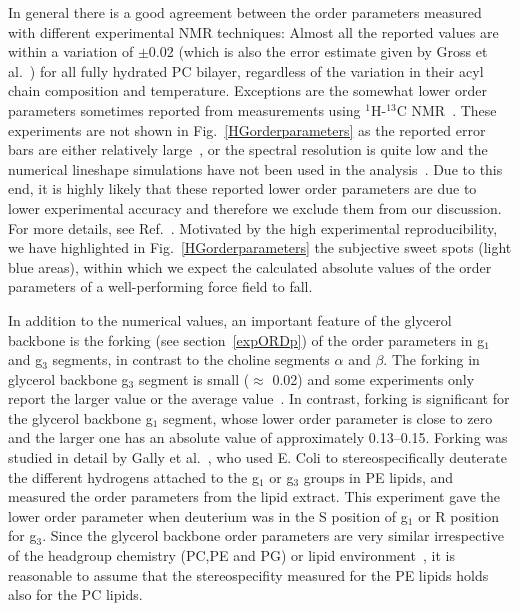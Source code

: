 \documentclass[journal=jacsat,manuscript=article]{achemso}
\begin{document}
In general there is a good agreement between the order parameters measured with different experimental NMR techniques: Almost all the 
reported values are within a variation of $\pm$0.02 (which is also the error estimate given by Gross et al.~\cite{gross97}) 
for all fully hydrated PC bilayer, regardless of the variation in their acyl chain composition and temperature.
Exceptions are the somewhat lower order parameters sometimes reported from measurements using $^1$H-$^{13}$C NMR~\cite{hong95a,hong95b,warschawski05}.
These experiments are not shown in Fig.~\ref{HGorderparameters} as the reported error bars are either relatively large~\cite{hong95a,hong95b}, 
or the spectral resolution is quite low and the numerical lineshape simulations have not been used in the analysis~\cite{warschawski05}.
Due to this end, it is highly likely that these reported lower order parameters are due to lower experimental 
accuracy and therefore we exclude them from our discussion. 
For more details, see Ref.~. 
Motivated by the high experimental reproducibility, we have highlighted in 
Fig.~\ref{HGorderparameters} the subjective sweet spots (light blue areas), within which we expect the calculated absolute 
values of the order parameters of a well-performing force field to fall.

In addition to the numerical values, an important feature of the glycerol backbone is the 
forking (see section~\ref{expORDp}) of the order parameters in g$_1$ and g$_3$ segments, in contrast to the choline segments $\alpha$ and $\beta$. 
The forking in glycerol backbone g$_3$ segment is small ($\approx$ 0.02) 
and some experiments only report the larger value or the average value~\cite{akutsu81,ferreira13}. 
In contrast, forking is significant for the glycerol backbone g$_1$ segment, whose lower order parameter is close to zero and the
larger one has an absolute value of approximately 0.13--0.15. Forking was studied in detail by Gally et al.~\cite{gally81}, who used E. Coli to 
stereospecifically deuterate the different hydrogens attached to the g$_1$ or g$_3$ groups in PE lipids, and measured the order parameters from the lipid 
extract. This experiment gave the lower order parameter when deuterium was in the S position of g$_1$ or R position for g$_3$.
Since the glycerol backbone order parameters are very similar irrespective of the headgroup chemistry (PC,PE and PG) or lipid 
environment~\cite{gally81}, it is reasonable to assume that the stereospecifity measured for the PE lipids
holds also for the PC lipids.
\end{document}
